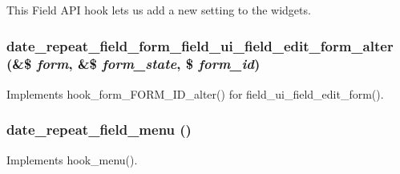 This Field API hook lets us add a new setting to the widgets. \hypertarget{date__repeat__field_8module_ac32396f6f544c90c240d4bd40e908124}{
\subsubsection[{date\_\-repeat\_\-field\_\-form\_\-field\_\-ui\_\-field\_\-edit\_\-form\_\-alter}]{\setlength{\rightskip}{0pt plus 5cm}date\_\-repeat\_\-field\_\-form\_\-field\_\-ui\_\-field\_\-edit\_\-form\_\-alter (\&\$ {\em form}, \/  \&\$ {\em form\_\-state}, \/  \$ {\em form\_\-id})}}
\label{date__repeat__field_8module_ac32396f6f544c90c240d4bd40e908124}
Implements hook\_\-form\_\-FORM\_\-ID\_\-alter() for field\_\-ui\_\-field\_\-edit\_\-form(). \hypertarget{date__repeat__field_8module_a0b5b94e740d6fdd96411f1c230a1d465}{
\subsubsection[{date\_\-repeat\_\-field\_\-menu}]{\setlength{\rightskip}{0pt plus 5cm}date\_\-repeat\_\-field\_\-menu ()}}
\label{date__repeat__field_8module_a0b5b94e740d6fdd96411f1c230a1d465}
Implements hook\_\-menu().

